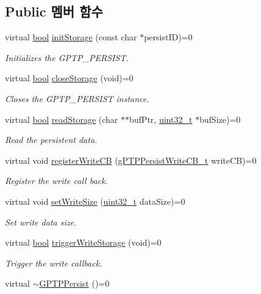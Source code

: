 \subsection*{Public 멤버 함수}
\begin{DoxyCompactItemize}
\item 
virtual \hyperlink{avb__gptp_8h_af6a258d8f3ee5206d682d799316314b1}{bool} \hyperlink{class_g_p_t_p_persist_ac74276c8d879ac7c9196d649d2936220}{init\+Storage} (const char $\ast$persist\+ID)=0
\begin{DoxyCompactList}\small\item\em Initializes the G\+P\+T\+P\+\_\+\+P\+E\+R\+S\+I\+ST. \end{DoxyCompactList}\item 
virtual \hyperlink{avb__gptp_8h_af6a258d8f3ee5206d682d799316314b1}{bool} \hyperlink{class_g_p_t_p_persist_a5cb33a278c6eb0c2aacffeb4ef06f7b5}{close\+Storage} (void)=0
\begin{DoxyCompactList}\small\item\em Closes the G\+P\+T\+P\+\_\+\+P\+E\+R\+S\+I\+ST instance. \end{DoxyCompactList}\item 
virtual \hyperlink{avb__gptp_8h_af6a258d8f3ee5206d682d799316314b1}{bool} \hyperlink{class_g_p_t_p_persist_a5fac60570858ffddec27c8c848b198f1}{read\+Storage} (char $\ast$$\ast$buf\+Ptr, \hyperlink{parse_8c_a6eb1e68cc391dd753bc8ce896dbb8315}{uint32\+\_\+t} $\ast$buf\+Size)=0
\begin{DoxyCompactList}\small\item\em Read the persistent data. \end{DoxyCompactList}\item 
virtual void \hyperlink{class_g_p_t_p_persist_a555f71de9acef16c5cd2eaf2b34f68ec}{register\+Write\+CB} (\hyperlink{avbts__persist_8hpp_a79cbcb0be2bbb7984e94c586573cd5ba}{g\+P\+T\+P\+Persist\+Write\+C\+B\+\_\+t} write\+CB)=0
\begin{DoxyCompactList}\small\item\em Register the write call back. \end{DoxyCompactList}\item 
virtual void \hyperlink{class_g_p_t_p_persist_aed84eb3f99897b1a77cebbf1a9f7f7b6}{set\+Write\+Size} (\hyperlink{parse_8c_a6eb1e68cc391dd753bc8ce896dbb8315}{uint32\+\_\+t} data\+Size)=0
\begin{DoxyCompactList}\small\item\em Set write data size. \end{DoxyCompactList}\item 
virtual \hyperlink{avb__gptp_8h_af6a258d8f3ee5206d682d799316314b1}{bool} \hyperlink{class_g_p_t_p_persist_a0c61d64e8f30bb455de1b406c1236052}{trigger\+Write\+Storage} (void)=0
\begin{DoxyCompactList}\small\item\em Trigger the write callback. \end{DoxyCompactList}\item 
virtual \hyperlink{class_g_p_t_p_persist_ab936d5626ff62344a4d5c7b99eda7d11}{$\sim$\+G\+P\+T\+P\+Persist} ()=0
\end{DoxyCompactItemize}


